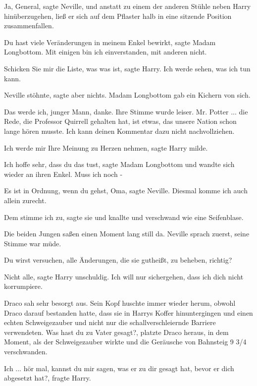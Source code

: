 \glqq{}Ja, General\grqq{}, sagte Neville, und anstatt zu einem der anderen
Stühle neben Harry hinüberzugehen, ließ er sich auf dem Pflaster halb in eine
sitzende Position zusammenfallen.

\glqq{}Du hast viele Veränderungen in meinem Enkel bewirkt\grqq{}, sagte Madam
Longbottom. \glqq{}Mit einigen bin ich einverstanden, mit anderen nicht.\grqq{}

\glqq{}Schicken Sie mir die Liste, was was ist\grqq{}, sagte Harry. \glqq{}Ich
werde sehen, was ich tun kann.\grqq{}

Neville stöhnte, sagte aber nichts. Madam Longbottom gab ein Kichern von sich.

\glqq{}Das werde ich, junger Mann, danke.\grqq{} Ihre Stimme wurde leiser. \glqq{}Mr.
Potter ... die Rede, die Professor Quirrell gehalten hat, ist etwas, das unsere
Nation schon lange hören musste. Ich kann deinen Kommentar dazu nicht
nachvollziehen.\grqq{}

\glqq{}Ich werde mir Ihre Meinung zu Herzen nehmen\grqq{}, sagte Harry milde.

\glqq{}Ich hoffe sehr, dass du das tust\grqq{}, sagte Madam Longbottom und
wandte sich wieder an ihren Enkel. \glqq{}Muss ich noch -\grqq{}

\glqq{}Es ist in Ordnung, wenn du gehst, Oma\grqq{}, sagte Neville.
\glqq{}Diesmal komme ich auch allein zurecht.\grqq{}

\glqq{}Dem stimme ich zu\grqq{}, sagte sie und knallte und verschwand wie eine
Seifenblase.

Die beiden Jungen saßen einen Moment lang still da. Neville sprach zuerst, seine
Stimme war müde.

\glqq{}Du wirst versuchen, alle Änderungen, die sie gutheißt, zu beheben,
richtig?\grqq{}

\glqq{}Nicht alle\grqq{}, sagte Harry unschuldig. \glqq{}Ich will nur
sichergehen, dass ich dich nicht korrumpiere.\grqq{}

Draco sah sehr besorgt aus. Sein Kopf huschte immer wieder herum, obwohl Draco
darauf bestanden hatte, dass sie in Harrys Koffer hinuntergingen und einen
echten Schweigezauber und nicht nur die schallverschleiernde Barriere
verwendeten. \glqq{}Was hast du zu Vater gesagt?\grqq{}, platzte Draco heraus,
in dem Moment, als der Schweigezauber wirkte und die Geräusche von Bahnsteig 9
3/4 verschwanden.

\glqq{}Ich ... hör mal, kannst du mir sagen, was er zu dir gesagt hat, bevor er
dich abgesetzt hat?\grqq{}, fragte Harry.

